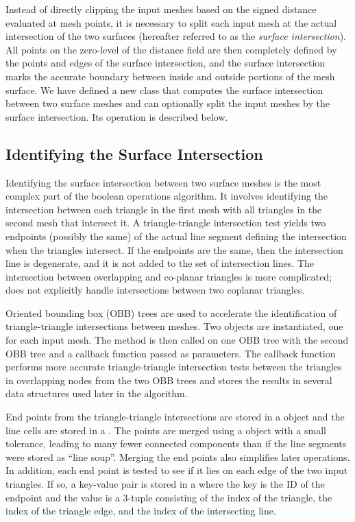 \documentclass{InsightArticle}
\begin{document}
Instead of directly clipping the input meshes based on the signed distance evaluated at mesh points, it is necessary to split each input mesh at the actual intersection of the two surfaces (hereafter referred to as the \emph{surface intersection}). All points on the zero-level of the distance field are then completely defined by the points and edges of the surface intersection, and the surface intersection marks the accurate boundary between inside and outside portions of the mesh surface. We have defined a new class  that computes the surface intersection between two surface meshes and can optionally split the input meshes by the surface intersection. Its operation is described below.

\subsection{Identifying the Surface Intersection}

Identifying the surface intersection between two surface meshes is the most complex part of the boolean operations algorithm. It involves identifying the intersection between each triangle in the first mesh with all triangles in the second mesh that intersect it. A triangle-triangle intersection test yields two endpoints (possibly the same) of the actual line segment defining the intersection when the triangles intersect. If the endpoints are the same, then the intersection line is degenerate, and it is not added to the set of intersection lines. The intersection between overlapping and co-planar triangles is more complicated;  does not explicitly handle intersections between two coplanar triangles.

Oriented bounding box (OBB) trees are used to accelerate the identification of triangle-triangle intersections between meshes. Two  objects are instantiated, one for each input mesh. The method  is then called on one OBB tree with the second OBB tree and a callback function passed as parameters. The callback function performs more accurate triangle-triangle intersection tests between the triangles in overlapping nodes from the two OBB trees and stores the results in several data structures used later in the algorithm.

End points from the triangle-triangle intersections are stored in a  object and the line cells are stored in a . The points  are merged using a  object with a small tolerance, leading to many fewer connected components than if the line segments were stored as ``line soup''. Merging the end points also simplifies later operations. In addition, each end point is tested to see if it lies on each edge of the two input triangles. If so, a key-value pair is stored in a  where the key is the ID of the endpoint and the value is a 3-tuple consisting of the index of the triangle, the index of the triangle edge, and the index of the intersecting line.
\end{document}
